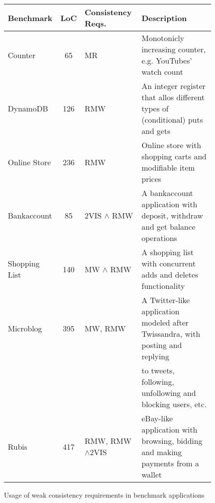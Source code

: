 \begin{figure}[t]
\centering
\begin{center}
\begin{footnotesize}
\begin{tabular}{||l | c  l  l||} 
\hline
 {\bf Benchmark} & {\bf LoC} & {\bf Consistency Reqs.} & {\bf
 Description}\\ [0.5ex] 
\hline\hline
Counter & 65 & MR & Monotonicly increasing counter, e.g.
YouTubes' watch 
count\\ \hline
DynamoDB & 126 & RMW & An integer register that allos different
types of (conditional) puts and gets \\ \hline
Online Store & 236 & RMW &  Online store with shopping carts
and modifiable item prices \\ \hline
Bankaccount & 85 & 2VIS $\wedge$ RMW & A bankaccount application with
deposit, withdraw and get balance operations\\ \hline
Shopping List  & 140  &  MW $\wedge$ RMW & A shopping list with
concurrent adds and deletes functionality\\ \hline 
Microblog & 395 &  MW, RMW & A Twitter-like application modeled after
Twissandra, with posting and replying
\\ & & & 
to tweets, following, unfollowing and blocking users, etc.\\ \hline
Rubis & 417 & RMW, RMW$\wedge$2VIS & eBay-like
application with browsing, bidding and making payments from a wallet \\  [1ex]
\hline
\end{tabular}
\end{footnotesize}
\end{center}
\caption{Usage of weak consistency requirements in benchmark
applications}
\label{fig:dist_table}
\end{figure}
